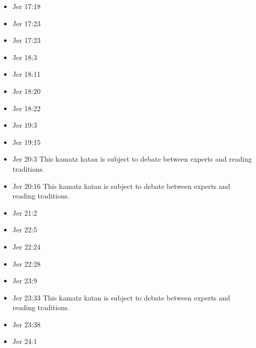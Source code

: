 \documentclass[14pt]{article}
\begin{document}
\begin{multicols}{2}
\begin{itemize}
						\item Jer 17:18
						
						\item Jer 17:23
						
						\item Jer 17:23
						
						\item Jer 18:3
						
						\item Jer 18:11
						
						\item Jer 18:20
						
						\item Jer 18:22
						
						\item Jer 19:3
						
						\item Jer 19:15
						
						\item Jer 20:3 This kamatz katan is subject to debate between experts and reading traditions.
						
						\item Jer 20:16 This kamatz katan is subject to debate between experts and reading traditions.
						
						\item Jer 21:2
						
						\item Jer 22:5
						
						\item Jer 22:24
						
						\item Jer 22:28
						
						\item Jer 23:9
						
						\item Jer 23:33 This kamatz katan is subject to debate between experts and reading traditions.
						
						\item Jer 23:38
						
						\item Jer 24:1
						

\end{itemize}
\end{multicols}
\end{document}
